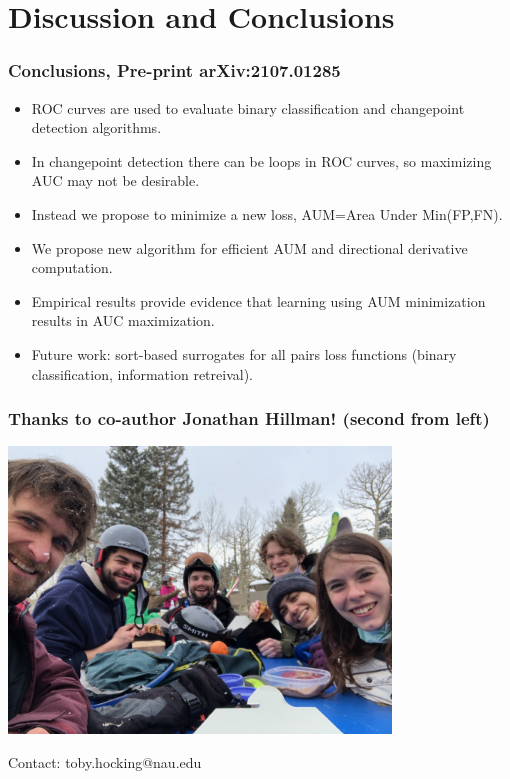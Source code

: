 \documentclass{beamer}
\begin{document}
\section{Discussion and Conclusions}

\begin{frame}
  \frametitle{Conclusions, Pre-print arXiv:2107.01285}
  \begin{itemize}
  \item ROC curves are used to evaluate binary classification and
    changepoint detection algorithms.
  \item In changepoint detection there can be loops in ROC curves, so
    maximizing AUC may not be desirable.
  \item Instead we propose to minimize a new loss, AUM=Area
    Under Min(FP,FN).
  \item We propose new algorithm for efficient AUM and directional
    derivative computation.
  \item Empirical results provide evidence that learning using AUM
    minimization results in AUC maximization.
  \item Future work: sort-based surrogates for all pairs loss
    functions (binary classification, information retreival).
  \end{itemize}
\end{frame}

\begin{frame}
  \frametitle{Thanks to co-author Jonathan Hillman! (second from left)}

  \includegraphics[height=3in]{2021-03-lab-ski-lunch} 

  Contact: toby.hocking@nau.edu

\end{frame}
\end{document}
